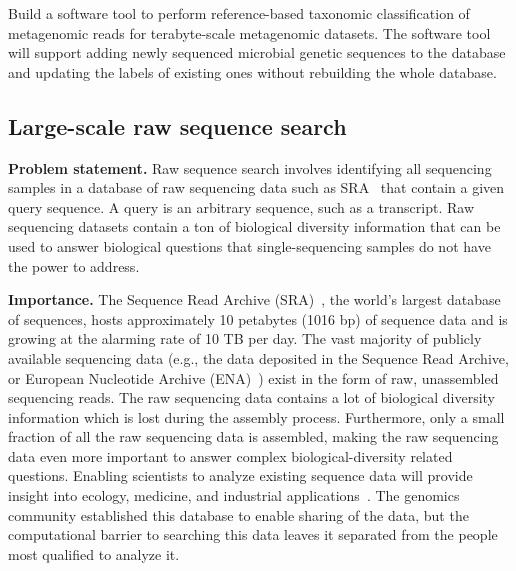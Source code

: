 \begin{rproblem}
Build a software tool to perform reference-based taxonomic classification of metagenomic reads for terabyte-scale metagenomic datasets. The software tool will support adding newly sequenced microbial genetic sequences to the database and updating the labels of existing ones without rebuilding the whole database.
\label{rprob:taxo-meta}
\end{rproblem}



\subsection{Large-scale raw sequence search}

\textbf{Problem statement.} Raw sequence search involves identifying all sequencing samples in a database of raw sequencing data such as SRA~\cite{kodama2012sequence,KatzSLKBO22} that contain a given query sequence. A query is an arbitrary sequence, such as a transcript. Raw sequencing datasets contain a ton of biological diversity information that can be used to answer biological questions that single-sequencing samples do not have the power to address.

\noindent
\textbf{Importance.}
The Sequence Read Archive (SRA)~\cite{kodama2012sequence}, the world’s largest database of sequences, hosts approximately 10 petabytes (1016 bp) of sequence data and is growing at the alarming rate of 10 TB per day.
%
The vast majority of publicly available sequencing data (e.g., the data deposited in the Sequence Read Archive, or European Nucleotide Archive (ENA)~\cite{CumminsAABDEGHH22}) exist in the form of raw, unassembled sequencing reads. The raw sequencing data contains a lot of biological diversity information which is lost during the assembly process. Furthermore, only a small fraction of all the raw sequencing data is assembled, making the raw sequencing data even more important to answer complex biological-diversity related questions.
%
Enabling scientists to analyze existing sequence data will provide insight into ecology, medicine, and industrial applications~\cite{LeviRAE18}.
%
The genomics community established this database to enable sharing of the data, but the computational barrier to searching this data leaves it separated from the people most qualified to analyze it.

